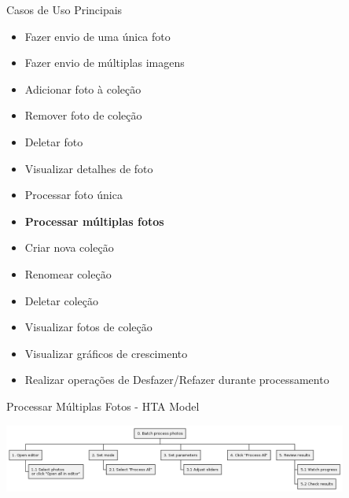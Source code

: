 \documentclass[landscape, 12pt]{beamer}
\begin{document}
\begin{frame}{Casos de Uso Principais}
    \begin{itemize}
        \item Fazer envio de uma única foto
        \item Fazer envio de múltiplas imagens
        \item Adicionar foto à coleção
        \item Remover foto de coleção
        \item Deletar foto
        \item Visualizar detalhes de foto
        \item Processar foto única
        \item \textbf{Processar múltiplas fotos}
        \item Criar nova coleção
        \item Renomear coleção
        \item Deletar coleção
        \item Visualizar fotos de coleção
        \item Visualizar gráficos de crescimento
        \item Realizar operações de Desfazer/Refazer durante processamento
    \end{itemize}
\end{frame}

\begin{frame}{Processar Múltiplas Fotos - HTA Model}
    \begin{center}
        \includegraphics[width=0.85\textwidth]{../figures/hta/UC012.png}
    \end{center}
\end{frame}
\end{document}
